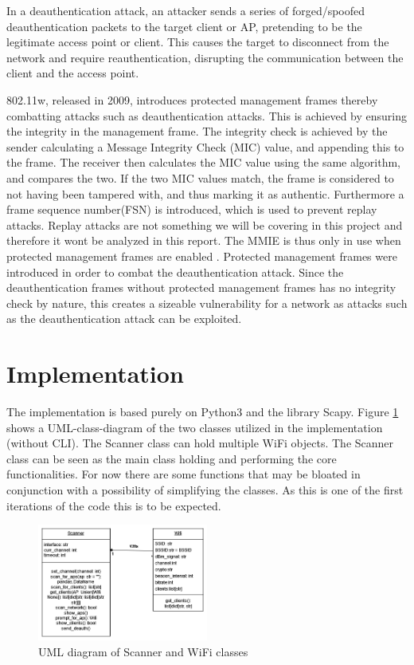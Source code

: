 In a deauthentication attack, an attacker sends a series of forged/spoofed deauthentication packets to the target client or AP, pretending to be the legitimate access point or client. This causes the target to disconnect from the network and require reauthentication, disrupting the communication between the client and the access point.

802.11w, released in 2009, introduces protected management frames thereby combatting attacks such as deauthentication attacks. This is achieved by ensuring the integrity in the management frame. The integrity check is achieved by the sender calculating a Message Integrity Check (MIC) value, and appending this to the frame. The receiver then calculates the MIC value using the same algorithm, and compares the two. If the two MIC values match, the frame is considered to not having been tampered with, and thus marking it as authentic. Furthermore a frame sequence number(FSN) is introduced, which is used to prevent replay attacks. Replay attacks are not something we will be covering in this project and therefore it wont be analyzed in this report. 
The MMIE is thus only in use when protected management frames are enabled \cite{IEEE_802.11w}. Protected management frames were introduced in order to combat the deauthentication attack. Since the deauthentication frames without protected management frames has no integrity check by nature, this creates a sizeable vulnerability for a network as attacks such as the deauthentication attack can be exploited.

\section{Implementation}

The implementation is based purely on Python3 and the library Scapy. Figure \ref{802.11 Security} shows a UML-class-diagram of the two classes utilized in the implementation (without CLI). The Scanner class can hold multiple WiFi objects. The Scanner class can be seen as the main class holding and performing the core functionalities. For now there are some functions that may be bloated in conjunction with a possibility of simplifying the classes. As this is one of the first iterations of the code this is to be expected. 

\begin{figure}[!htbp]
    \centering
    \includegraphics[width=0.5\textwidth]{Latex-Files/Billeder/Flowcharts/uml_diagram.png}
    \caption{UML diagram of Scanner and WiFi classes}
    \label{802.11 Security}
\end{figure}

